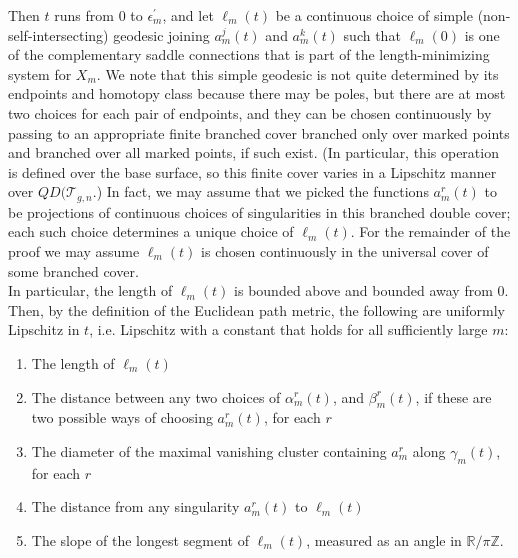\documentclass[12pt]{article}
\newcommand{\zz}{\mathbb{Z}}
\newcommand{\rr}{\mathbb{R}}
\begin{document}
\noindent Then $t$ runs from $0$ to $\epsilon_m^\prime$, and let $\ell_m(t)$ be a continuous choice of simple (non-self-intersecting) geodesic joining $a_m^j(t)$ and $a_m^k(t)$ such that $\ell_m(0)$ is one of the complementary saddle connections that is part of the length-minimizing system for $X_m$. We note that this simple geodesic is not quite determined by its endpoints and homotopy class because there may be poles, but there are at most two choices for each pair of endpoints, and they can be chosen continuously by passing to an appropriate finite branched cover branched only over marked points and branched over all marked points, if such exist. (In particular, this operation is defined over the base surface, so this finite cover varies in a Lipschitz manner over $QD(\mathcal{T}_{g,n}$.) In fact, we may assume that we picked the functions $a_m^r(t)$ to be projections of continuous choices of singularities in this branched double cover; each such choice determines a unique choice of $\ell_m(t)$. For the remainder of the proof we may assume $\ell_m(t)$ is chosen continuously in the universal cover of some branched cover.\\

\noindent In particular, the length of $\ell_m(t)$ is bounded above and bounded away from $0$. Then, by the definition of the Euclidean path metric, the following are uniformly Lipschitz in $t$, i.e. Lipschitz with a constant that holds for all sufficiently large $m$:

\begin{enumerate}
\item The length of $\ell_m(t)$
\item The distance between any two choices of $\alpha_m^r(t)$, and $\beta_m^r(t)$, if these are two possible ways of choosing $a_m^r(t)$, for each $r$
\item The diameter of the maximal vanishing cluster containing $a_m^r$ along $\gamma_m(t)$, for each $r$
\item The distance from any singularity $a_m^r(t)$ to $\ell_m(t)$
\item The slope of the longest segment of $\ell_m(t)$, measured as an angle in $\rr/\pi\zz.$
\end{enumerate}
\end{document}
